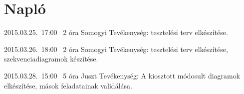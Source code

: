 %
\section{Napló}

\begin{naplo}

\bejegyzes
{2015.03.25.~17:00~}
{2 óra}
{Somogyi}
{Tevékenység: tesztelési terv elkészítése.}

\bejegyzes
{2015.03.26.~18:00~}
{2 óra}
{Somogyi}
{Tevékenység: tesztelési terv elkészítése, szekvenciadiagramok készítése.}


\bejegyzes
{2015.03.28.~15:00~}
{5 óra}
{Juszt}
{Tevékenység: A kiosztott módosult diagramok elkészítése, mások feladatainak validálása.}



\end{naplo}

